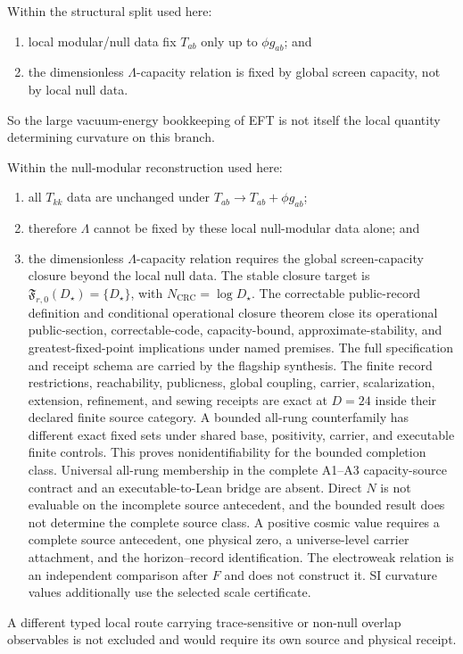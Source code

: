 \begin{proposition}
Within the structural split used here:
\begin{enumerate}[leftmargin=2em]
\item local modular/null data fix \(T_{ab}\) only up to \(\phi g_{ab}\); and
\item the dimensionless \(\Lambda\)-capacity relation is fixed by global screen capacity, not by local null data.
\end{enumerate}
So the large vacuum-energy bookkeeping of EFT is not itself the local quantity determining
curvature on this branch.
\end{proposition}

\begin{theorem}
Within the null-modular reconstruction used here:
\begin{enumerate}[leftmargin=2em]
\item all \(T_{kk}\) data are unchanged under \(T_{ab}\to T_{ab}+\phi g_{ab}\);
\item therefore \(\Lambda\) cannot be fixed by these local null-modular data alone; and
\item the dimensionless \(\Lambda\)-capacity relation requires the global
screen-capacity closure beyond the local null data. The stable closure target is
\(\mathfrak F_{r,0}(D_\star)=\{D_\star\}\), with
\(N_{\mathrm{CRC}}=\log D_\star\). The correctable public-record definition and
conditional operational closure theorem close its operational
public-section, correctable-code, capacity-bound, approximate-stability, and
greatest-fixed-point implications under named premises. The full specification
and receipt schema are carried by the flagship synthesis. The
finite record restrictions, reachability, publicness, global coupling,
carrier, scalarization, extension, refinement, and sewing receipts are exact
at \(D=24\) inside their declared finite source category. A bounded all-rung
counterfamily has different
exact fixed sets under shared base, positivity, carrier, and executable finite
controls. This proves nonidentifiability for the bounded completion class.
Universal all-rung membership in the complete A1--A3 capacity-source contract
and an executable-to-Lean bridge are absent. Direct \(N\) is not evaluable on
the incomplete source antecedent, and the bounded result does not determine
the complete source class. A positive cosmic value requires a complete source antecedent, one
physical zero, a universe-level carrier attachment, and the horizon--record
identification.
The electroweak relation is an independent comparison after \(F\) and does
not construct it. SI curvature values additionally use the selected scale
certificate.
\end{enumerate}
A different typed local route carrying trace-sensitive or non-null overlap
observables is not excluded and would require its own source and physical
receipt.
\end{theorem}


